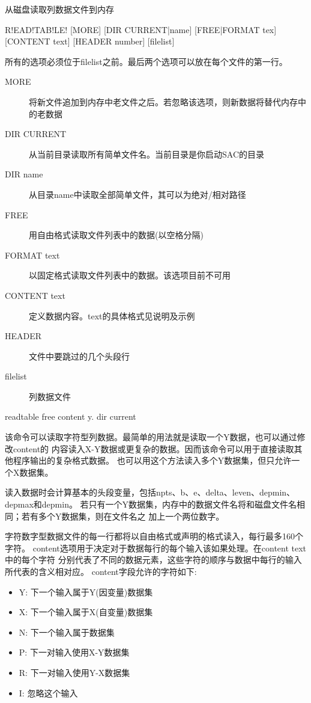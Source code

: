 \label{cmd:readtable}

从磁盘读取列数据文件到内存

\begin{SACSTX}
R!EAD!TAB!LE! [MORE] [DIR CURRENT|name] [FREE|FORMAT tex]
    [CONTENT text] [HEADER number] [filelist]
\end{SACSTX}
所有的选项必须位于filelist之前。最后两个选项可以放在每个文件的第一行。

\begin{description}
\item [MORE] 将新文件追加到内存中老文件之后。若忽略该选项，则新数据将替代内存中的老数据
\item [DIR CURRENT] 从当前目录读取所有简单文件名。当前目录是你启动SAC的目录
\item [DIR name] 从目录name中读取全部简单文件，其可以为绝对/相对路径
\item [FREE] 用自由格式读取文件列表中的数据(以空格分隔)
\item [FORMAT text] 以固定格式读取文件列表中的数据。该选项目前不可用
\item [CONTENT text] 定义数据内容。text的具体格式见说明及示例
\item [HEADER] 文件中要跳过的几个头段行
\item [filelist] 列数据文件
\end{description}

\begin{SACDFT}
readtable free content y. dir current
\end{SACDFT}

该命令可以读取字符型列数据。最简单的用法就是读取一个Y数据，也可以通过修改content的
内容读入X-Y数据或更复杂的数据。因而该命令可以用于直接读取其他程序输出的复杂格式数据。
也可以用这个方法读入多个Y数据集，但只允许一个X数据集。

读入数据时会计算基本的头段变量，包括npts、b、e、delta、leven、depmin、depmax和depmin。
若只有一个Y数据集，内存中的数据文件名将和磁盘文件名相同；若有多个Y数据集，则在文件名之
加上一个两位数字。

字符数字型数据文件的每一行都将以自由格式或声明的格式读入，每行最多160个字符。
content选项用于决定对于数据每行的每个输入该如果处理。在content text中的每个字符
分别代表了不同的数据元素，这些字符的顺序与数据中每行的输入所代表的含义相对应。
content字段允许的字符如下:
\begin{itemize}
\item Y: 下一个输入属于Y(因变量)数据集
\item X: 下一个输入属于X(自变量)数据集
\item N: 下一个输入属于数据集
\item P: 下一对输入使用X-Y数据集
\item R: 下一对输入使用Y-X数据集
\item I: 忽略这个输入
\end{itemize}

